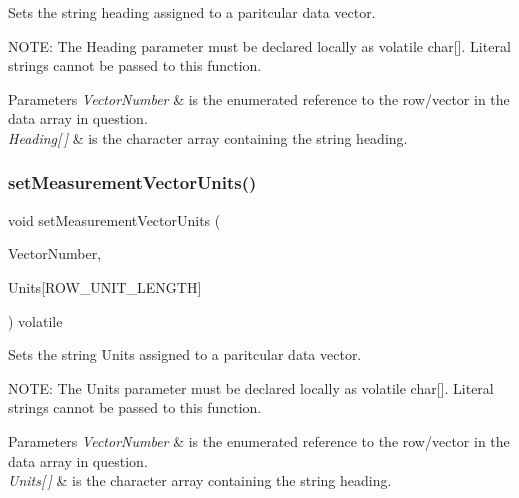 Sets the string heading assigned to a paritcular data vector. 

N\+O\+TE\+: The Heading parameter must be declared locally as volatile char\mbox{[}\mbox{]}. Literal strings cannot be passed to this function. 
\begin{DoxyParams}{Parameters}
{\em Vector\+Number} & is the enumerated reference to the row/vector in the data array in question. \\
\hline
{\em Heading\mbox{[}$\,$\mbox{]}} & is the character array containing the string heading. \\
\hline
\end{DoxyParams}
\mbox{\label{class_master_a5f955da291f31441d726c4ded74c32bd}} 
\subsubsection{\texorpdfstring{setMeasurementVectorUnits()}{setMeasurementVectorUnits()}}
{\footnotesize\ttfamily void set\+Measurement\+Vector\+Units (\begin{DoxyParamCaption}\item[{\mbox{\hyperlink{_s_p_i___instruction_set_8h_a9d8048399836e11887f85cc8dc3d75d5}{Measurement\+Vectors}}}]{Vector\+Number,  }\item[{volatile char}]{Units\mbox{[}\+R\+O\+W\+\_\+\+U\+N\+I\+T\+\_\+\+L\+E\+N\+G\+T\+H\mbox{]} }\end{DoxyParamCaption}) volatile}



Sets the string Units assigned to a paritcular data vector. 

N\+O\+TE\+: The Units parameter must be declared locally as volatile char\mbox{[}\mbox{]}. Literal strings cannot be passed to this function. 
\begin{DoxyParams}{Parameters}
{\em Vector\+Number} & is the enumerated reference to the row/vector in the data array in question. \\
\hline
{\em Units\mbox{[}$\,$\mbox{]}} & is the character array containing the string heading. \\
\hline
\end{DoxyParams}
\mbox{\label{class_master_a5af38dc77ec10af275ed892e756aee64}} 
